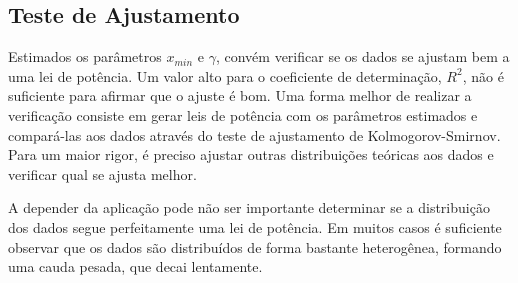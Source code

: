 \documentclass{article}
\begin{document}
\subsection{Teste de Ajustamento}

Estimados os parâmetros $x_{min}$ e $\gamma$, convém verificar se os dados se ajustam bem a uma lei de potência. Um valor alto para o coeficiente de determinação, $R^2$, não é suficiente para afirmar que o ajuste é bom. Uma  forma melhor de realizar a verificação consiste em gerar leis de potência com os parâmetros estimados e compará-las aos dados através do teste de ajustamento de Kolmogorov-Smirnov. Para um maior rigor, é preciso ajustar outras distribuições teóricas aos dados e verificar qual se ajusta melhor.

A depender da aplicação pode não ser importante determinar se a distribuição dos dados segue perfeitamente uma lei de potência. Em muitos casos é suficiente observar que os dados são distribuídos de forma bastante heterogênea, formando uma cauda pesada, que decai lentamente.





% 
% 
% 
% 
% 
% 
% 
% 
\end{document}
